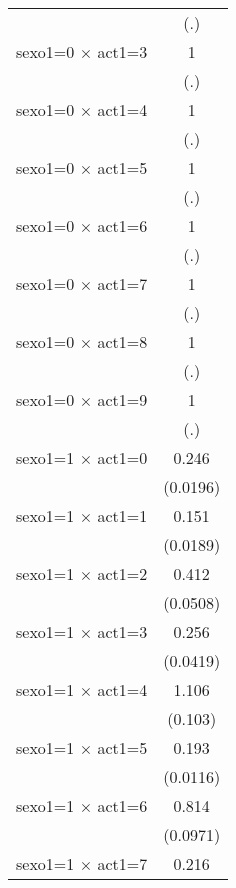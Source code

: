 {\begin{tabular}{l*{1}{c}}
                    &         (.)         \\
[1em]
sexo1=0 $\times$ act1=3&           1         \\
                    &         (.)         \\
[1em]
sexo1=0 $\times$ act1=4&           1         \\
                    &         (.)         \\
[1em]
sexo1=0 $\times$ act1=5&           1         \\
                    &         (.)         \\
[1em]
sexo1=0 $\times$ act1=6&           1         \\
                    &         (.)         \\
[1em]
sexo1=0 $\times$ act1=7&           1         \\
                    &         (.)         \\
[1em]
sexo1=0 $\times$ act1=8&           1         \\
                    &         (.)         \\
[1em]
sexo1=0 $\times$ act1=9&           1         \\
                    &         (.)         \\
[1em]
sexo1=1 $\times$ act1=0&       0.246\sym{***}\\
                    &    (0.0196)         \\
[1em]
sexo1=1 $\times$ act1=1&       0.151\sym{***}\\
                    &    (0.0189)         \\
[1em]
sexo1=1 $\times$ act1=2&       0.412\sym{***}\\
                    &    (0.0508)         \\
[1em]
sexo1=1 $\times$ act1=3&       0.256\sym{***}\\
                    &    (0.0419)         \\
[1em]
sexo1=1 $\times$ act1=4&       1.106         \\
                    &     (0.103)         \\
[1em]
sexo1=1 $\times$ act1=5&       0.193\sym{***}\\
                    &    (0.0116)         \\
[1em]
sexo1=1 $\times$ act1=6&       0.814         \\
                    &    (0.0971)         \\
[1em]
sexo1=1 $\times$ act1=7&       0.216\sym{***}\\

\end{tabular}}
